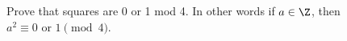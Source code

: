   Prove that squares are 0 or 1 mod 4. In other words
  if $a \in \Z$, then $a^2 \equiv 0 \text{ or } 1 \pmod{4}$.
